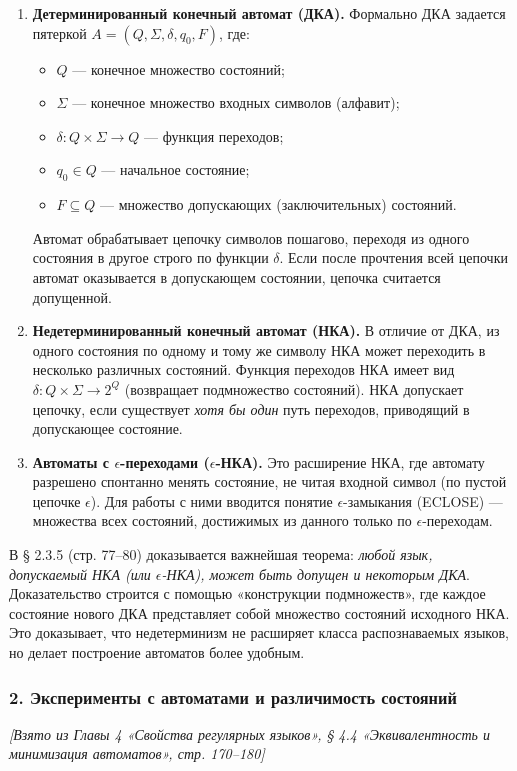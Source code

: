\documentclass[a4paper,12pt]{article}
\begin{document}
\begin{enumerate}
    \item \textbf{Детерминированный конечный автомат (ДКА).} Формально ДКА задается пятеркой \(A = (Q, \Sigma, \delta, q_0, F)\), где:
    \begin{itemize}
        \item \(Q\) — конечное множество состояний;
        \item \(\Sigma\) — конечное множество входных символов (алфавит);
        \item \(\delta: Q \times \Sigma \to Q\) — функция переходов;
        \item \(q_0 \in Q\) — начальное состояние;
        \item \(F \subseteq Q\) — множество допускающих (заключительных) состояний.
    \end{itemize}
    Автомат обрабатывает цепочку символов пошагово, переходя из одного состояния в другое строго по функции \(\delta\). Если после прочтения всей цепочки автомат оказывается в допускающем состоянии, цепочка считается допущенной.
    
    \item \textbf{Недетерминированный конечный автомат (НКА).} В отличие от ДКА, из одного состояния по одному и тому же символу НКА может переходить в несколько различных состояний. Функция переходов НКА имеет вид \(\delta: Q \times \Sigma \to 2^Q\) (возвращает подмножество состояний). НКА допускает цепочку, если существует \textit{хотя бы один} путь переходов, приводящий в допускающее состояние.
    
    \item \textbf{Автоматы с \(\epsilon\)-переходами (\(\epsilon\)-НКА).} Это расширение НКА, где автомату разрешено спонтанно менять состояние, не читая входной символ (по пустой цепочке \(\epsilon\)). Для работы с ними вводится понятие \(\epsilon\)-замыкания (ECLOSE) — множества всех состояний, достижимых из данного только по \(\epsilon\)-переходам.
\end{enumerate}
В § 2.3.5 (стр. 77–80) доказывается важнейшая теорема: \textit{любой язык, допускаемый НКА (или \(\epsilon\)-НКА), может быть допущен и некоторым ДКА}. Доказательство строится с помощью «конструкции подмножеств», где каждое состояние нового ДКА представляет собой множество состояний исходного НКА. Это доказывает, что недетерминизм не расширяет класса распознаваемых языков, но делает построение автоматов более удобным.

\subsubsection*{2. Эксперименты с автоматами и различимость состояний}
\textit{[Взято из Главы 4 «Свойства регулярных языков», § 4.4 «Эквивалентность и минимизация автоматов», стр. 170–180]}
\end{document}
